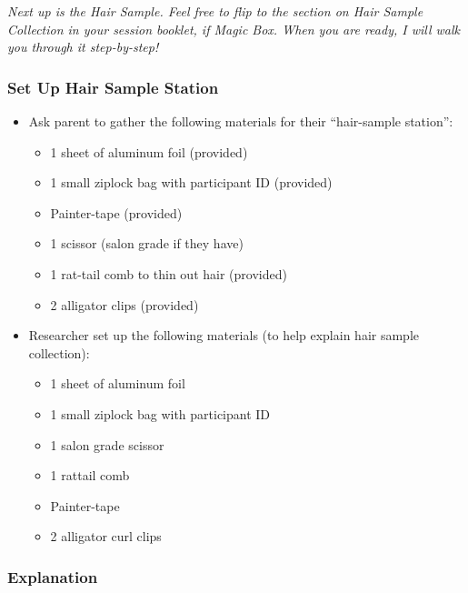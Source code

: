 \documentclass[]{book}
\begin{document}
\emph{Next up is the Hair Sample. Feel free to flip to the section on Hair Sample Collection in your session booklet, if Magic Box. When you are ready, I will walk you through it step-by-step!}

\hypertarget{set-up-hair-sample-station-2}{%
\subsubsection{Set Up Hair Sample Station}\label{set-up-hair-sample-station-2}}

\begin{itemize}
\item
  Ask parent to gather the following materials for their ``hair-sample station'':

  \begin{itemize}
  \item
    1 sheet of aluminum foil (provided)
  \item
    1 small ziplock bag with participant ID (provided)
  \item
    Painter-tape (provided)
  \item
    1 scissor (salon grade if they have)
  \item
    1 rat-tail comb to thin out hair (provided)
  \item
    2 alligator clips (provided)
  \end{itemize}
\item
  Researcher set up the following materials (to help explain hair sample collection):

  \begin{itemize}
  \item
    1 sheet of aluminum foil
  \item
    1 small ziplock bag with participant ID
  \item
    1 salon grade scissor
  \item
    1 rattail comb
  \item
    Painter-tape
  \item
    2 alligator curl clips
  \end{itemize}
\end{itemize}

\hypertarget{explanation-1}{%
\subsubsection{Explanation}\label{explanation-1}}
\end{document}
